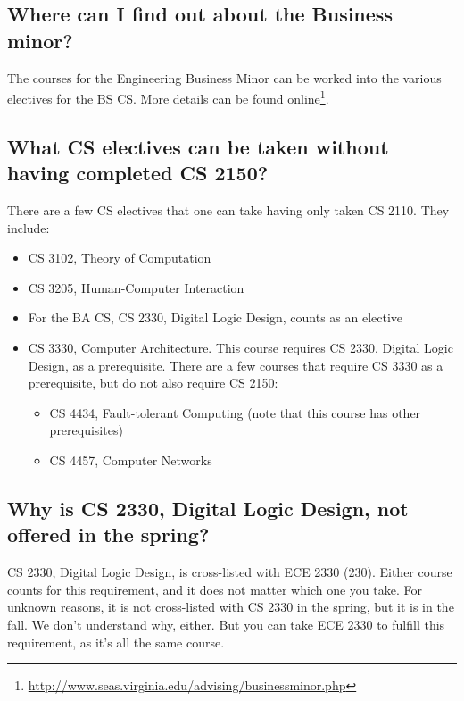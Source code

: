 \documentclass[10pt,letter]{book}
\newenvironment{itemlist}{
\begin{itemize}
\setlength{\itemsep}{0pt}
\setlength{\parskip}{0pt}}
{\end{itemize}}
\newcommand{\myurl}[1]{\footnote{\scriptsize\url{#1}}}
\begin{document}
\subsection{Where can I find out about the Business minor?}

The courses for the Engineering Business Minor can be worked into the
various electives for the BS CS. More details can be found
online\myurl{http://www.seas.virginia.edu/advising/businessminor.php}.


\subsection{What CS electives can be taken without having completed CS
  2150?}

There are a few CS electives that one can take having only taken CS
2110.  They include:
\begin{itemlist}
\item CS 3102, Theory of Computation
\item CS 3205, Human-Computer Interaction
\item For the BA CS, CS 2330, Digital Logic Design, counts as an
  elective
\item CS 3330, Computer Architecture.  This course requires CS
  2330, Digital Logic Design, as a prerequisite.  There are a
  few courses that require CS 3330 as a prerequisite, but do not also
  require CS 2150:
  \begin{itemlist}
  \item CS 4434, Fault-tolerant Computing (note that this course
    has other prerequisites)
  \item CS 4457, Computer Networks
  \end{itemlist}
\end{itemlist}

\subsection{Why is CS 2330, Digital Logic Design, not offered
  in the spring?}
\label{cs2330}

CS 2330, Digital Logic Design, is cross-listed with ECE 2330
(230).  Either course counts for this requirement, and it does not
matter which one you take.  For unknown reasons, it is not
cross-listed with CS 2330 in the spring, but it is in the fall.
We don't understand why, either.  But you can take ECE 2330 to
fulfill this requirement, as it's all the same course.
\end{document}
